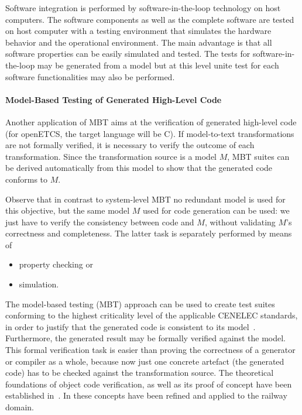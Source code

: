 \documentclass{template/openetcs_report}
\begin{document}
Software integration is performed by software-in-the-loop technology
on host computers. The software components as well as the complete
software are tested on host computer with a testing environment that
simulates the hardware behavior and the operational environment. The
main advantage is that all software properties can be easily simulated
and tested. The tests for software-in-the-loop may be generated from a
model but at this level unite test for each software functionalities
may also be performed.

\paragraph{Model-Based Testing of Generated High-Level Code}
Another application of MBT aims at the verification of generated
high-level code (for openETCS, the target language will be C).
If model-to-text transformations are not formally verified, it
is necessary to verify the outcome of each transformation. Since the transformation
source is a model $M$, MBT suites can be derived automatically from this model to show that the
generated code conforms to $M$. 

Observe that in contrast to system-level MBT no redundant model is used for this objective, but the
same model $M$ used for code generation can be used: we just have to verify the consistency between 
code and $M$, without validating $M$'s correctness and completeness. The latter task is separately performed
by means of 
\begin{itemize}
\item property checking or
\item simulation.
\end{itemize}
The model-based testing (MBT) approach can be used to create test
suites conforming to the highest criticality level of the applicable
CENELEC standards, in order to justify that the generated code is
consistent to its model~\cite{PeleskaVL11Nfm,pel2011a,peleska2009d}.
Furthermore, the generated result may be formally verified against the
model. This formal verification task is easier than proving the
correctness of a generator or compiler as a whole, because now just
one concrete artefact (the generated code) has to be checked against
the transformation source. The theoretical foundations of object code
verification, as well as its proof of concept have been established
in~\cite{Pnueli98}. In
\cite{RSRSChapter2012,DBLP:journals/fac/HaxthausenPK11} these concepts
have been refined and applied to the railway domain.
\end{document}
